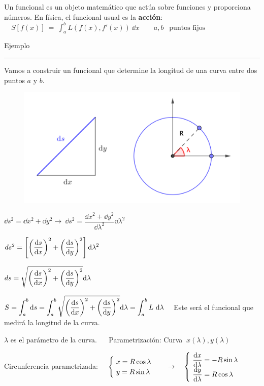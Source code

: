 Un funcional es un objeto matemático que actúa sobre funciones y proporciona números. En física, el funcional usual es la \textbf{acción}:
$\quad S[f(x)] \ = \ \displaystyle \int_a^b L \left(f(x),f'(x)\right) \ \dd x \qquad a,b\ \ \text{ puntos fijos}$


\begin{small}
Ejemplo $\quad$ \rule{200pt}{0.1pt}

\textcolor{gris}{ Vamos a construir un funcional que determine la longitud de una curva entre dos puntos $a$ y $b$.}

\begin{multicols}{2}
\begin{figure}[H]
	\centering
	\includegraphics[width=.45\textwidth]{imagenes/apendices-01-03.png}
\end{figure}

\textcolor{gris}{ 
$\dd s^2=\dd x^2+\dd y^2 \to \ \dd s^2 = \dfrac{\dd x^2+\dd y^2}{\dd \lambda^2}\dd \lambda^2$
 }
 
 \textcolor{gris}{
 $ds^2=	\displaystyle \left[ \left( \dv{s}{x} \right)^2+\left( \dv{s}{y} \right)^2 \right] \dd \lambda^2$
 }
 
  \textcolor{gris}{
 $ds=	\displaystyle \sqrt{ \left( \dv{s}{x} \right)^2+\left( \dv{s}{y} \right)^2}  \dd \lambda$
 }
 
\end{multicols}

 \textcolor{gris}{
 $S=	\displaystyle \int_a^b \dd s = \int_a^b \sqrt{ \left( \dv{s}{x} \right)^2+\left( \dv{s}{y} \right)^2}  \dd \lambda =\int_a^b L \ \dd \lambda \quad $ Este será el funcional que medirá la longitud de la curva.
 }
 
\textcolor{gris}{$\lambda$ es el parámetro de la curva. $\quad$ Parametrización: Curva $ \ x(\lambda), y(\lambda)$}
 
\textcolor{gris}{
Circunferencia parametrizada: $\quad \begin{cases} \ x=R\cos \lambda \\ \ y=R \sin \lambda  \end{cases} \quad \to \quad \begin{cases} \ \displaystyle \dv{x}{\lambda}=-R\sin \lambda \\  \ \displaystyle \dv{y}{\lambda}=R\cos \lambda  \end{cases} $ }



\end{small}

